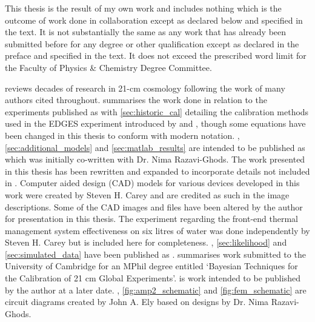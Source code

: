 
\begin{declaration}

This thesis is the result of my own work and includes nothing which is the outcome of work done in collaboration except as declared below and specified in the text. It is not substantially the same as any work that has already been submitted before for any degree or other qualification except as declared in the preface and specified in the text. It does not exceed the prescribed word limit for the Faculty of Physics \& Chemistry Degree Committee.

 reviews decades of research in 21-cm cosmology following the work of many authors cited throughout.  summarises the work done in relation to the experiments published as \citet{edgesNature} with \cref{sec:historic_cal} detailing the calibration methods used in the EDGES experiment introduced by \citet{rogersCal} and \citet{edgesCal}, though some equations have been changed in this thesis to conform with modern notation. , \cref{sec:additional_models} and \cref{sec:matlab_results} are intended to be published as \mbox{\citet{nimaCal}} which was initially co-written with Dr. Nima Razavi-Ghods. The work presented in this thesis has been rewritten and expanded to incorporate details not included in \citet{nimaCal}. Computer aided design (CAD) models for various devices developed in this work were created by Steven H. Carey and are credited as such in the image descriptions. Some of the CAD images and files have been altered by the author for presentation in this thesis. The experiment regarding the front-end thermal management system effectiveness on six litres of water was done independently by Steven H. Carey but is included here for completeness. , \cref{sec:likelihood} and \cref{sec:simulated_data} have been published as \citet{ian_bayes}.  summarises work submitted to the University of Cambridge for an MPhil degree entitled ‘Bayesian Techniques for the Calibration of 21 cm Global Experiments’.  is work intended to be published by the author at a later date. , \cref{fig:amp2_schematic} and \cref{fig:fem_schematic} are circuit diagrams created by John A. Ely based on designs by Dr. Nima Razavi-Ghods.


\end{declaration}
